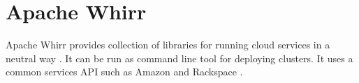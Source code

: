 \section{Apache Whirr}

Apache Whirr provides collection of libraries for running cloud services in a
neutral way . It can be run as command line tool for deploying clusters. It uses
a common services API such as Amazon and Rackspace \cite{hid-
sp18-421-whirrCloud}.

